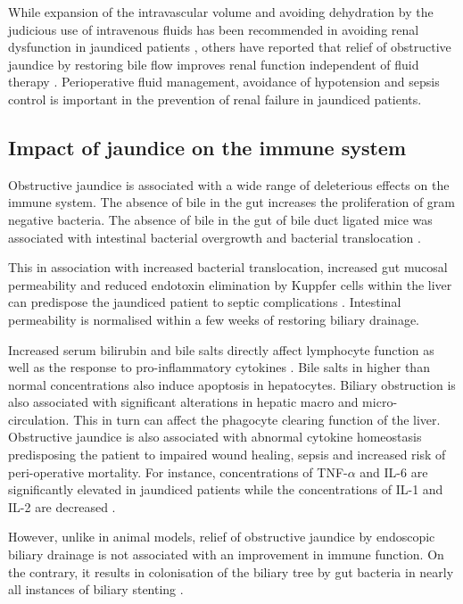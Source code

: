 While expansion of the intravascular volume and avoiding dehydration by the judicious use of intravenous fluids has been recommended in avoiding renal dysfunction in jaundiced patients \parencite{parks_prospective_1994}, others have reported that relief of obstructive jaundice by restoring bile flow improves renal function independent of fluid therapy \parencite{padillo_randomized_2005}. 
Perioperative fluid management, avoidance of hypotension and sepsis control is important in the prevention of renal failure in jaundiced patients.

\subsection{Impact of jaundice on the immune system}

Obstructive jaundice is associated with a wide range of deleterious effects on the immune system. 
The absence of bile in the gut increases the proliferation of gram negative bacteria. 
The absence of bile in the gut of bile duct ligated mice was associated with intestinal bacterial overgrowth and bacterial translocation \parencite{deitch_obstructive_1990}.

This in association with increased bacterial translocation, increased gut mucosal permeability and reduced endotoxin elimination by Kuppfer cells within the liver can predispose the jaundiced patient to septic complications \parencite{nehez_compromise_2002}.
Intestinal permeability is normalised within a few weeks of restoring biliary drainage.

Increased serum bilirubin and bile salts directly affect lymphocyte function as well as the response to pro-inflammatory cytokines \parencite{scott-conner_pathophysiology_1994}.
Bile salts in higher than normal concentrations also induce apoptosis in hepatocytes. 
Biliary obstruction is also associated with significant alterations in hepatic macro and micro-circulation. 
This in turn can affect the phagocyte clearing function of the liver. 
Obstructive jaundice is also associated with abnormal cytokine homeostasis predisposing the patient to impaired wound healing, sepsis and increased risk of peri-operative mortality. 
For instance, concentrations of TNF-$\alpha$ and IL-6 are significantly elevated in jaundiced patients while the concentrations of IL-1 and IL-2 are decreased \parencite{padillo_cytokines_2001}.

However, unlike in animal models, relief of obstructive jaundice by endoscopic biliary drainage is not associated with an improvement in immune function.
On the contrary, it results in colonisation of the biliary tree by gut bacteria in nearly all instances of biliary stenting \parencite{kimmings_endotoxin_2000}.


